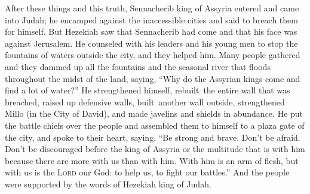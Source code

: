 
\begin{inparaenum}
     After these things and this truth, Sennacherib king of Assyria entered and came into Judah; he encamped against the inaccessible cities and said to breach them for himself.%
     But Hezekiah saw that Sennacherib had come and that his face was against Jerusalem.%
     He counseled with his leaders and his young men to stop the fountains of waters outside the city, and they helped him.%
     Many people gathered and they dammed up all the fountains and the seasonal river that floods throughout the midst of the land, saying, ``Why do the Assyrian kings come and find a lot of water?''%
     He strengthened himself, rebuilt\thinspace\understood\ the entire wall that was breached, raised up defensive walls, built\understood\ another wall outside, strengthened Millo (in the City of David), and made javelins and shields in abundance.%
     He put the battle chiefs over the people and assembled them to himself to a plaza gate of the city, and spoke to their heart, saying,%
     ``Be strong and brave. Don't be afraid. Don't be discouraged before the king of Assyria or the multitude that is with him because there are more with us than with him.%
     With him is an arm of flesh, but with us is the \textsc{Lord} our God: to help us, to fight our battles.'' And the people were supported by the words of Hezekiah king of Judah.%
    

\end{inparaenum}
